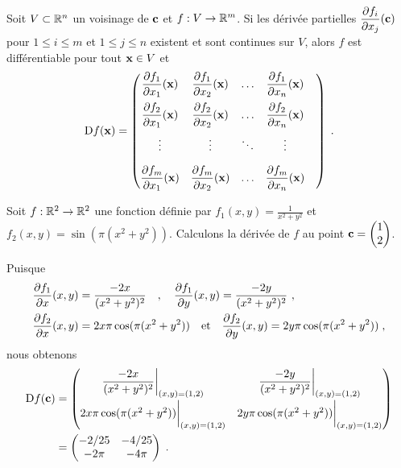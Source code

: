 {\begin{focus}{\prp}
Soit $V\subset \mathbb{R}^n$ un voisinage de $\mathbf{c}$ et $f:V\rightarrow \mathbb{R}^m$.
Si les dérivée partielles
$\displaystyle \frac{\partial f_i}{\partial x_j}(\mathbf{c})$ pour $1\leq i \leq m$ et
$1\leq j \leq n$ existent et sont continues sur $V$, alors $f$ est
différentiable pour tout $\mathbf{x} \in V$ et
\[
\mathrm{D} f(\mathbf{x}) =
\begin{pmatrix}
\displaystyle \frac{\partial f_1}{\partial x_1}(\mathbf{x}) &
\displaystyle \frac{\partial f_1}{\partial x_2}(\mathbf{x}) & \ldots &
\displaystyle \frac{\partial f_1}{\partial x_n}(\mathbf{x}) \\[1em]
\displaystyle \frac{\partial f_2}{\partial x_1}(\mathbf{x}) &
\displaystyle \frac{\partial f_2}{\partial x_2}(\mathbf{x}) & \ldots &
\displaystyle \frac{\partial f_2}{\partial x_n}(\mathbf{x}) \\[1em]
\vdots & \vdots & \ddots & \vdots & \\[1em]
\displaystyle \frac{\partial f_m}{\partial x_1}(\mathbf{x}) &
\displaystyle \frac{\partial f_m}{\partial x_2}(\mathbf{x}) & \ldots &
\displaystyle \frac{\partial f_m}{\partial x_n}(\mathbf{x})
\end{pmatrix} \; .
\]
\end{focus}

\begin{egg}
Soit $f:\mathbb{R}^2\rightarrow \mathbb{R}^2$ une fonction définie par
$\displaystyle f_1(x,y) = \frac{1}{x^2+y^2}$ et
$f_2(x,y) = \sin(\pi(x^2+y^2))$.  Calculons la dérivée de $f$ au point
$\mathbf{c} = \begin{pmatrix} 1 \\ 2 \end{pmatrix}$.

Puisque
\begin{align*}
\frac{\partial f_1}{\partial x}(x,y) &= \frac{-2x}{(x^2+y^2)^2} \quad , \quad 
\frac{\partial f_1}{\partial y}(x,y) = \frac{-2y}{(x^2+y^2)^2} \ , \\
\frac{\partial f_2}{\partial x}(x,y) &= 2x \pi \cos(\pi(x^2+y^2))
\quad \text{et} \quad 
\frac{\partial f_2}{\partial y}(x,y) = 2y \pi \cos(\pi(x^2+y^2)) \; ,
\end{align*}
nous obtenons
\begin{align*}
\mathrm{D} f(\mathbf{c}) &=
\begin{pmatrix}
\displaystyle \frac{-2x}{(x^2+y^2)^2}\bigg|_{(x,y)=(1,2)} &
\displaystyle \frac{-2y}{(x^2+y^2)^2}\bigg|_{(x,y)=(1,2)} \\[1em]
2x \pi \cos(\pi(x^2+y^2))\bigg|_{(x,y)=(1,2)} &
2y \pi \cos(\pi(x^2+y^2))\bigg|_{(x,y)=(1,2)}
\end{pmatrix} \\
&=
\begin{pmatrix}
-2/25 & -4/25 \\ -2\pi & -4\pi
\end{pmatrix} \; .
\end{align*}
\end{egg}

}
